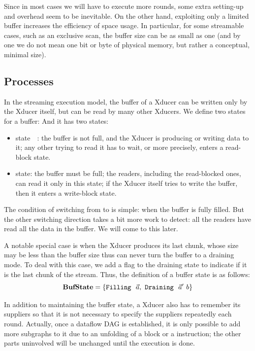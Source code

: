 Since in most cases we will have to execute more rounds, some extra setting-up and overhead seem to be inevitable.
On the other hand, exploiting only a limited buffer increases the efficiency of space usage. 
In particular, for some streamable cases, such as an exclusive scan, the buffer size can be as small as one (and by one we do not mean one bit or byte of physical memory, but rather a conceptual, minimal size).


\subsection{Processes}
In the streaming execution model, the buffer of a Xducer can be written only by the Xducer itself, but can be read by many other Xducers. 
We define two states for a buffer:
And it has two states: 
\begin{itemize}
	\item \filling state　: the buffer is not full, and the Xducer is producing or writing data to it; any other trying to read it has to wait, or more precisely, enters a read-block state.

	\item \draining state: the buffer must be full; the readers, including the read-blocked ones, can read it only in this state; if the Xducer itself tries to write the buffer, then it enters a write-block state.
\end{itemize}

The condition of switching from \filling to \draining is simple: when the buffer is fully filled. 
But the other switching direction takes a bit more work to detect: all the readers have read all the data in the buffer. We will come to this later.


A notable special case is when the Xducer produces its last chunk, whose size may be less than the buffer size thus can never turn the buffer to a draining mode.
To deal with this case, we add a flag to the draining state to indicate if it is the last chunk of the stream. 
Thus, the definition of a buffer state is as follows:
$$\mathbf{BufState} = \{\texttt{Filling} \  \ \vec a, \ \texttt{Draining} \  \ \vec a' \ b \} $$


In addition to maintaining the buffer state, a Xducer also has to remember its suppliers so that it is not necessary to specify the suppliers repeatedly each round. 
Actually, once a dataflow DAG is established, it is only possible to add more subgraphs to it due to an unfolding of a \wc block or a \sc instruction; the other parts uninvolved will be unchanged until the execution is done.


